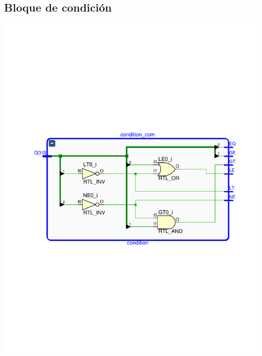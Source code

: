 \documentclass[8pt,executivepaper]{article}
\begin{document}
\subsection{Bloque de condición}
\begin{center}
  \includegraphics[scale=0.75]{rtl/condicion.pdf}
\end{center}
\end{document}
